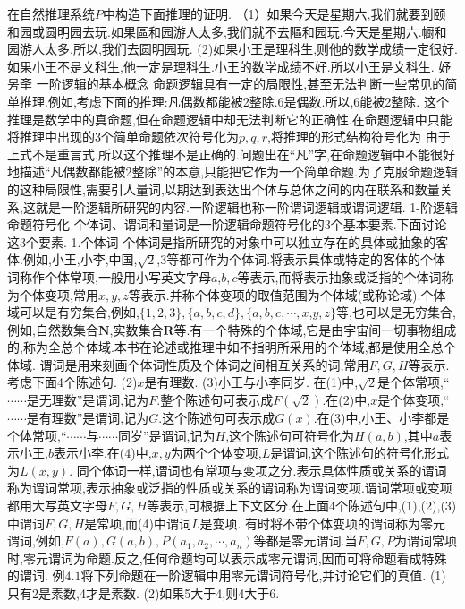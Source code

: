 {在自然推理系统$P$中构造下面推理的证明.
（1）如果今天是星期六,我们就要到颐和园或圆明园去玩.如果區和园游人太多,我们就不去䧢和园玩.今天是星期六.㡡和园游人太多.所以,我们去圆明园玩.
(2)如果小王是理科生,则他的数学成绩一定很好.如果小王不是文科生,他一定是理科生.小王的数学成绩不好.所以小王是文科生.
{妤昘㪯}
{一阶逻辑的基本概念}
命题逻辑具有一定的局限性,甚至无法判断一些常见的简单推理.例如,考虑下面的推理:凡偶数都能被2整除.6是偶数.所以,6能被2整除.
这个推理是数学中的真命题,但在命题逻辑中却无法判断它的正确性.在命题逻辑中只能将推理中出现的3个简单命题依次符号化为$p,q,r$,将推理的形式结构符号化为
由于上式不是重言式,所以这个推理不是正确的.问题出在“凡”字,在命题逻辑中不能很好地描述“凡偶数都能被2整除”的本意,只能把它作为一个简单命题.为了克服命题逻辑的这种局限性,需要引人量词,以期达到表达出个体与总体之间的内在联系和数量关系,这就是一阶逻辑所研究的内容.一阶逻辑也称一阶谓词逻辑或谓词逻辑.
{1-阶逻辑命题符号化}
个体词、谓词和量词是一阶逻辑命题符号化的3个基本要素.下面讨论这3个要素.
{1.个体词}
个体词是指所研究的对象中可以独立存在的具体或抽象的客体.例如,小王,小李,中国,$\sqrt{2}$,3等都可作为个体词.将表示具体或特定的客体的个体词称作个体常项,一般用小写英文字母$a$,$b,c$等表示,而将表示抽象或泛指的个体词称为个体变项,常用$x,y,z$等表示.并称个体变项的取值范围为个体域(或称论域).个体域可以是有穷集合,例如,$\{1,2,3\},\{a,b,c,d\},\{a,b,c,\cdots,x$,$y,z\}$等,也可以是无穷集合,例如,自然数集合$\mathbf{N}$,实数集合$\mathbf{R}$等.有一个特殊的个体域,它是由宇宙间一切事物组成的,称为全总个体域.本书在论述或推理中如不指明所采用的个体域,都是使用全总个体域.
谓词是用来刻画个体词性质及个体词之间相互关系的词,常用$F,G,H$等表示.考虑下面4个陈述句.
(2)$x$是有理数.
(3)小王与小李同岁.
在(1)中,$\sqrt{2}$是个体常项,“$\cdots\cdots$是无理数”是谓词,记为$F$.整个陈述句可表示成$F(\sqrt{2})$.在(2)中,$x$是个体变项,“$\cdots\cdots$是有理数”是谓词,记为$G$.这个陈述句可表示成$G(x)$.在(3)中,小王、小李都是个体常项,“$\cdots\cdots$与$\cdots\cdots$同岁”是谓词,记为$H$,这个陈述句可符号化为$H(a,b)$,其中$a$表示小王,$b$表示小李.在(4)中,$x,y$为两个个体变项,$L$是谓词,这个陈述句的符号化形式为$L(x,y)$.
同个体词一样,谓词也有常项与变项之分.表示具体性质或关系的谓词称为谓词常项,表示抽象或泛指的性质或关系的谓词称为谓词变项.谓词常项或变项都用大写英文字母$F,G,H$等表示,可根据上下文区分.在上面4个陈述句中,(1),(2),(3)中谓词$F,G,H$是常项,而(4)中谓词$L$是变项.
有时将不带个体变项的谓词称为零元谓词,例如,$F(a),G(a,b),P\left(a_{1},a_{2},\cdots,a_{n}\right)$等都是零元谓词.当$F,G,P$为谓词常项时,零元谓词为命题.反之,任何命题均可以表示成零元谓词,因而可将命题看成特殊的谓词.
例$4.1$将下列命题在一阶逻辑中用零元谓词符号化,并讨论它们的真值.
(1)只有2是素数,4才是素数.
(2)如果5大于4,则4大于6.
}
